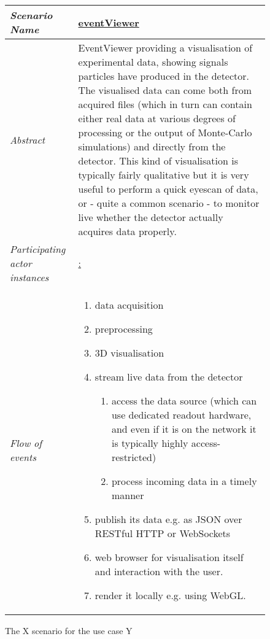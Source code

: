 \begin{figure}[htb]
	\centering
	\begin{longtable}{p{3cm} @{\hskip 1cm} p{12cm}}
		\hline
		\textit{Scenario Name} & \underline{eventViewer}\\
		\hline
		\textit{Abstract} &
		EventViewer providing a visualisation of experimental data, showing signals particles have produced in the detector.
		The visualised data can come both from acquired files (which in turn can contain either real data at various degrees of processing or the output of Monte-Carlo simulations) and directly from the detector.
		This kind of visualisation is typically fairly qualitative but it is very useful to perform a quick eyescan of data, or - quite a common scenario - to monitor live whether the detector actually acquires data properly.
		\\
		\hline
		\textit{Participating actor instances} & 
		\underline{:}\\
		\hline
		\textit{Flow of events} &
		\begin{enumerate}
			\item data acquisition
			\item preprocessing
			\item 3D visualisation
			\item stream live data from the detector
			\begin{enumerate}
				\item access the data source (which can use dedicated readout hardware, and even if it is on the network it is typically highly access-restricted)
				\item process incoming data in a timely manner
			\end{enumerate}
			\item publish its data e.g. as JSON over RESTful HTTP or WebSockets
			\item web browser for visualisation itself and interaction with the user.
			\item render it locally e.g. using WebGL.
		\end{enumerate}
		\\
		\hline
	\end{longtable}
	\caption{The X scenario for the use case Y}
\end{figure}
